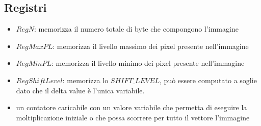 \documentclass[11pt]{article} %
\begin{document}
\subsection{Registri}
\begin{itemize}
\item $RegN$: memorizza il numero totale di byte che compongono l'immagine
\item $RegMaxPL$: memorizza il livello massimo dei pixel presente nell'immagine
\item $RegMinPL$: memorizza il livello minimo dei pixel presente nell'immagine	
\item $RegShiftLevel$: memorizza lo $SHIFT\_LEVEL$, può essere computato a soglie dato che il delta value è l'unica variabile.
\item un contatore caricabile con un valore variabile che permetta di eseguire la moltiplicazione iniziale o che possa scorrere per tutto il vettore l'immagine

	
\end{itemize}
\end{document}
